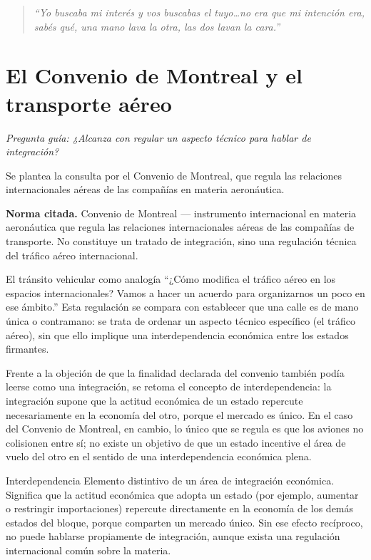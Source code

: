 \documentclass[12pt,oneside]{book}
\newenvironment{citadocente}
  {\begin{quote}\itshape\RaggedRight}
  {\end{quote}}
\begin{document}
\begin{citadocente}
``Yo buscaba mi interés y vos buscabas el tuyo\ldots no era que mi intención era, sabés qué, una mano lava la otra, las dos lavan la cara.''
\end{citadocente}

\section{El Convenio de Montreal y el transporte aéreo}

\textit{Pregunta guía: ¿Alcanza con regular un aspecto técnico para hablar de integración?}

Se plantea la consulta por el Convenio de Montreal, que regula las relaciones internacionales aéreas de las compañías en materia aeronáutica.

\begin{important}
\textbf{Norma citada.} Convenio de Montreal — instrumento internacional en materia aeronáutica que regula las relaciones internacionales aéreas de las compañías de transporte. No constituye un tratado de integración, sino una regulación técnica del tráfico aéreo internacional.
\end{important}

\begin{example}{El tránsito vehicular como analogía}
``¿Cómo modifica el tráfico aéreo en los espacios internacionales? Vamos a hacer un acuerdo para organizarnos un poco en ese ámbito.'' Esta regulación se compara con establecer que una calle es de mano única o contramano: se trata de ordenar un aspecto técnico específico (el tráfico aéreo), sin que ello implique una interdependencia económica entre los estados firmantes.
\end{example}

Frente a la objeción de que la finalidad declarada del convenio también podía leerse como una integración, se retoma el concepto de interdependencia: la integración supone que la actitud económica de un estado repercute necesariamente en la economía del otro, porque el mercado es único. En el caso del Convenio de Montreal, en cambio, lo único que se regula es que los aviones no colisionen entre sí; no existe un objetivo de que un estado incentive el área de vuelo del otro en el sentido de una interdependencia económica plena.

\begin{definition}{Interdependencia}
Elemento distintivo de un área de integración económica. Significa que la actitud económica que adopta un estado (por ejemplo, aumentar o restringir importaciones) repercute directamente en la economía de los demás estados del bloque, porque comparten un mercado único. Sin ese efecto recíproco, no puede hablarse propiamente de integración, aunque exista una regulación internacional común sobre la materia.
\end{definition}
\end{document}
